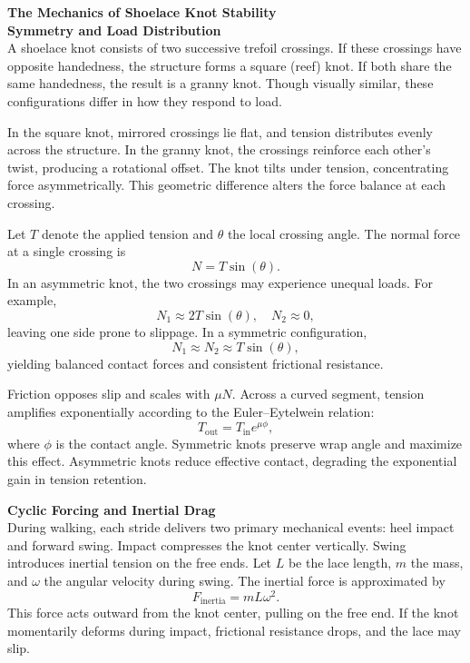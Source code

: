 \begin{technical}
{\Large\textbf{The Mechanics of Shoelace Knot Stability}}\\[0.7em]

\textbf{Symmetry and Load Distribution}\\[0.5em]
A shoelace knot consists of two successive trefoil crossings. If these crossings have opposite handedness, the structure forms a square (reef) knot. If both share the same handedness, the result is a granny knot. Though visually similar, these configurations differ in how they respond to load.

In the square knot, mirrored crossings lie flat, and tension distributes evenly across the structure. In the granny knot, the crossings reinforce each other’s twist, producing a rotational offset. The knot tilts under tension, concentrating force asymmetrically. This geometric difference alters the force balance at each crossing.

Let $T$ denote the applied tension and $\theta$ the local crossing angle. The normal force at a single crossing is
$$
N = T \sin(\theta).
$$
In an asymmetric knot, the two crossings may experience unequal loads. For example,
$$
N_1 \approx 2T \sin(\theta), \quad N_2 \approx 0,
$$
leaving one side prone to slippage. In a symmetric configuration,
$$
N_1 \approx N_2 \approx T \sin(\theta),
$$
yielding balanced contact forces and consistent frictional resistance.

Friction opposes slip and scales with $\mu N$. Across a curved segment, tension amplifies exponentially according to the Euler–Eytelwein relation:
$$
T_{\text{out}} = T_{\text{in}} e^{\mu \phi},
$$
where $\phi$ is the contact angle. Symmetric knots preserve wrap angle and maximize this effect. Asymmetric knots reduce effective contact, degrading the exponential gain in tension retention.

\textbf{Cyclic Forcing and Inertial Drag}\\[0.5em]
During walking, each stride delivers two primary mechanical events: heel impact and forward swing. Impact compresses the knot center vertically. Swing introduces inertial tension on the free ends. Let $L$ be the lace length, $m$ the mass, and $\omega$ the angular velocity during swing. The inertial force is approximated by
$$
F_{\text{inertia}} = m L \omega^2.
$$
This force acts outward from the knot center, pulling on the free end. If the knot momentarily deforms during impact, frictional resistance drops, and the lace may slip.


\end{technical}

